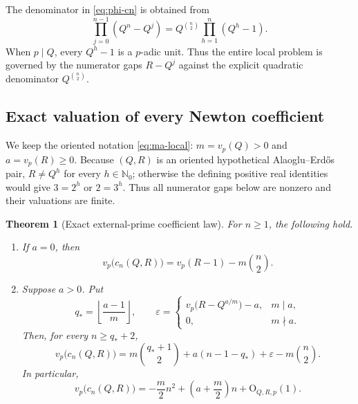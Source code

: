 \documentclass[11pt,oneside]{article}
\newtheorem{theorem}{Theorem}[section]
\theoremstyle{definition}
\newcommand{\Nzero}{\mathbb N_0}
\newcommand{\vp}{v_p}
\newcommand{\bigO}{\mathrm O}
\newcommand{\AEconj}{Alaoglu--Erd\H{o}s}
\begin{document}
The denominator in \eqref{eq:phi-cn} is obtained from
\[
 \prod_{j=0}^{n-1}(Q^n-Q^j)
 =Q^{\binom n2}\prod_{h=1}^n(Q^h-1).
\]
When $p\mid Q$, every $Q^h-1$ is a $p$-adic unit.  Thus the entire local problem is governed
by the numerator gaps $R-Q^j$ against the explicit quadratic denominator
$Q^{\binom n2}$.

\subsection{Exact valuation of every Newton coefficient}

We keep the oriented notation \eqref{eq:ma-local}: $m=\vp(Q)>0$ and
$a=\vp(R)\ge0$.
Because $(Q,R)$ is an oriented hypothetical \AEconj{} pair,
$R\ne Q^h$ for every $h\in\Nzero$; otherwise the defining positive real
identities would give $3=2^h$ or $2=3^h$.  Thus all numerator gaps below
are nonzero and their valuations are finite.

\begin{theorem}[Exact external-prime coefficient law]\label{thm:coeff-valuation}
For $n\ge1$, the following hold.

\begin{enumerate}[label=(\alph*)]
\item If $a=0$, then
\begin{equation}\label{eq:coeff-a0}
 \vp\bigl(c_n(Q,R)\bigr)
 =\vp(R-1)-m\binom n2.
\end{equation}

\item Suppose $a>0$.  Put
\begin{equation}\label{eq:qstar-epsilon}
 q_* =\left\lfloor\frac{a-1}{m}\right\rfloor,
 \qquad
 \varepsilon=
 \begin{cases}
  \vp\bigl(R-Q^{a/m}\bigr)-a,&m\mid a,\\
  0,&m\nmid a.
 \end{cases}
\end{equation}
Then, for every $n\ge q_*+2$,
\begin{equation}\label{eq:coeff-a-pos}
 \vp\bigl(c_n(Q,R)\bigr)
 =m\binom{q_*+1}{2}
  +a(n-1-q_*)+\varepsilon
  -m\binom n2.
\end{equation}
In particular,
\begin{equation}\label{eq:coeff-asymptotic}
 \vp\bigl(c_n(Q,R)\bigr)
 =-\frac m2n^2+\left(a+\frac m2\right)n+\bigO_{Q,R,p}(1).
\end{equation}
\end{enumerate}
\end{theorem}
\end{document}
